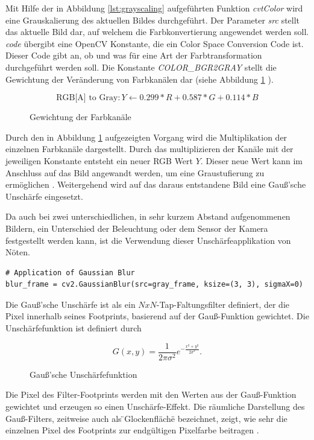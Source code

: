 Mit Hilfe der in Abbildung \ref{lst:grayscaling} aufgeführten Funktion \emph{cvtColor} wird eine Grauskalierung des aktuellen Bildes durchgeführt. Der Parameter \emph{src} stellt das aktuelle Bild dar, auf welchem die Farbkonvertierung angewendet werden soll. \emph{code} übergibt eine OpenCV Konstante, die ein Color Space Conversion Code ist. Dieser Code gibt an, ob und was für eine Art der Farbtransformation durchgeführt werden soll. Die Konstante \emph{COLOR\_BGR2GRAY} stellt die Gewichtung der Veränderung von Farbkanälen dar (siehe Abbildung \ref{eq:rgbatogray} \cite{opencv_bg_subtraction4}). 

\begin{figure}[htb]
	\[\text{RGB[A] to Gray}: Y \leftarrow 0.299 * R + 0.587 * G + 0.114 * B \]
	\caption{Gewichtung der Farbkanäle}
	\label{eq:rgbatogray}
\end{figure}

Durch den in Abbildung \ref{eq:rgbatogray} aufgezeigten Vorgang wird die Multiplikation der einzelnen Farbkanäle dargestellt. Durch das multiplizieren der Kanäle mit der jeweiligen Konstante entsteht ein neuer RGB Wert $Y$. Dieser neue Wert kann im Anschluss auf das Bild angewandt werden, um eine Graustufierung zu ermöglichen \cite{opencv_bg_subtraction4}. Weitergehend wird auf das daraus entstandene Bild eine Gauß'sche Unschärfe eingesetzt. 

Da auch bei zwei unterschiedlichen, in sehr kurzem Abstand aufgenommenen Bildern, ein Unterschied der Beleuchtung oder dem Sensor der Kamera festgestellt werden kann, ist die Verwendung dieser Unschärfeapplikation von Nöten. 

\vspace*{10mm}
\begin{lstlisting}[caption={Anwendung des Weichzeichners}, label={lst:gaussianblur}]
# Application of Gaussian Blur
blur_frame = cv2.GaussianBlur(src=gray_frame, ksize=(3, 3), sigmaX=0)
\end{lstlisting}

Die Gauß'sche Unschärfe ist als ein $NxN$-Tap-Faltungsfilter definiert, der die Pixel innerhalb seines Footprints, basierend auf der Gauß-Funktion gewichtet. Die Unschärfefunktion ist definiert durch 

\begin{figure}[htb]
	\[G(x,y) = \frac{1}{2\pi \sigma^2}e^{-\frac{x^2+y^2}{2\sigma^2}}.\]
	\caption{Gauß'sche Unschärfefunktion}
	\label{eq:gaussian}
\end{figure}

Die Pixel des Filter-Footprints werden mit den Werten aus der Gauß-Funktion gewichtet und erzeugen so einen Unschärfe-Effekt. Die räumliche Darstellung des Gauß-Filters, zeitweise auch als \"{}Glockenfläche\"{} bezeichnet, zeigt, wie sehr die einzelnen Pixel des Footprints zur endgültigen Pixelfarbe beitragen \cite{rastergrid}.


